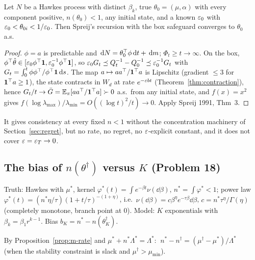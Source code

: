 \begin{corollary}\label{cor:m-spreij}\Ps{}
Let $N$ be a Hawkes process with distinct $\beta_k$, true $\theta_0=(\mu,\alpha)$ with every component positive, $n(\theta_0)<1$, any initial state, and a known $\varepsilon_0$ with $\varepsilon_0<\theta_{0i}<1/\varepsilon_0$. Then Spreij's recursion with the box safeguard converges to $\theta_0$ a.s.
\end{corollary}
\begin{proof}
$\phi=a$ is predictable and $\,\mathrm d N=\theta_0^{\top}\phi\,\mathrm d t+\,\mathrm d m$; $\Phi_t\ge t\to\infty$. On the box, $\phi^{\top}\hat\theta\in[\varepsilon_0\phi^{\top}\mathbf 1,\varepsilon_0^{-1}\phi^{\top}\mathbf 1]$, so $\varepsilon_0G_t\preceq Q_t^{-1}-Q_0^{-1}\preceq\varepsilon_0^{-1}G_t$ with $G_t=\int_0^t\phi\phi^{\top}/\phi^{\top}\mathbf 1\,\mathrm d s$. The map $a\mapsto aa^{\top}/\mathbf 1^{\top} a$ is Lipschitz (gradient $\le3$ for $\mathbf 1^{\top} a\ge1$), the state contracts in $W_d$ at rate $e^{-\varepsilon bt}$ (Theorem~\ref{thm:contraction}), hence $G_t/t\to\bar G=\mathbb{E}_\pi[aa^{\top}/\mathbf 1^{\top} a]\succ0$ a.s.\ from any initial state, and $f(x)=x^2$ gives $f(\log\lambda_{\max})/\lambda_{\min}=O((\log t)^2/t)\to0$. Apply Spreij 1991, Thm~3.
\end{proof}
It gives consistency at every fixed $n<1$ without the concentration machinery of Section~\ref{sec:regret}, but no rate, no regret, no $\varepsilon$-explicit constant, and it does not cover $\varepsilon=\varepsilon_T\to0$.

\subsection{The bias of $n(\theta^\dagger)$ versus $K$ (Problem 18)}\label{sec:mis-bias}

Truth: Hawkes with $\mu^*$, kernel $\varphi^*(t)=\int e^{-\beta t}\nu(\dd\beta)$, $n^*=\int\varphi^*<1$; power law $\varphi^*(t)=(n^*\eta/\tau)(1+t/\tau)^{-(1+\eta)}$, i.e.\ $\nu(\dd\beta)=c\beta^\eta e^{-\tau\beta}\dd\beta$, $c=n^*\tau^\eta/\Gamma(\eta)$ (completely monotone, branch point at $0$). Model: $K$ exponentials with $\beta_k=\beta_1r^{k-1}$. Bias $b_K=n^*-n(\theta^\dagger_K)$.

\begin{proposition}\label{prop:m-bias}\Pt{}
By Proposition~\ref{prop:m-rate} and $\mu^*+n^*\Lambda^*=\Lambda^*$: $\;n^*-n^\dagger=(\mu^\dagger-\mu^*)/\Lambda^*$ (when the stability constraint is slack and $\mu^\dagger>\mu_{\min}$).
\end{proposition}

